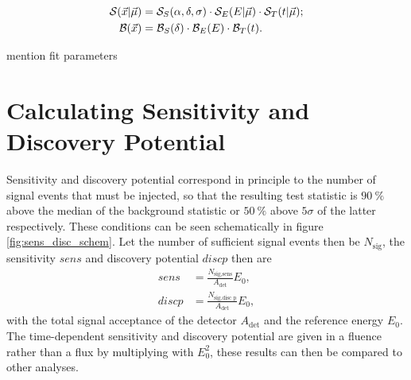 \begin{align}
  \mathcal{S}(\vec{x}|\vec{\mu})
  &= \mathcal{S}_S(\alpha,\delta,\sigma)
  \cdot \mathcal{S}_E(E|\vec{\mu})
  \cdot \mathcal{S}_T(t|\vec{\mu});
  \\
  \mathcal{B}(\vec{x})
  &= \mathcal{B}_S(\delta)
  \cdot \mathcal{B}_E(E)
  \cdot \mathcal{B}_T(t).
  \label{eq:pdf}
\end{align}

mention fit parameters\\


\section{Calculating Sensitivity and Discovery Potential}

Sensitivity and discovery potential correspond in principle to the number of signal events that must be injected, so that the resulting test statistic is $\SI{90}{\percent}$ above the median of the background statistic or $\SI{50}{\percent}$ above $\num{5}\sigma$ of the latter respectively.
These conditions can be seen schematically in figure \ref{fig:sens_disc_schem}.
Let the number of sufficient signal events then be $N_\text{sig}$, the sensitivity $sens$ and discovery potential $disc p$ then are
\begin{align}
  sens &= \frac{N_\text{sig,sens}}{A_\text{det}}E_0, \\
  disc p &= \frac{N_\text{sig,disc p}}{A_\text{det}}E_0,
\end{align}
with the total signal acceptance of the detector $A_\text{det}$ and the reference energy $E_0$.
The time-dependent sensitivity and discovery potential are given in a fluence rather than a flux by multiplying with $E_0^2$, these results can then be compared to other analyses.
